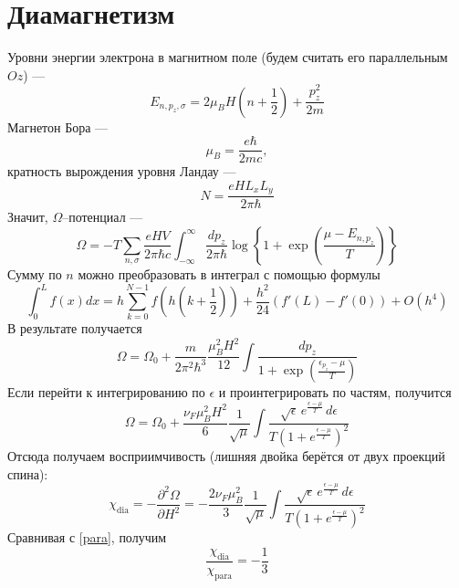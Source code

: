 \documentclass{article}
\begin{document}
\section{Диамагнетизм}
Уровни энергии электрона в магнитном поле (будем считать его параллельным $Oz$) ---
\begin{equation}
    E_{n,p_z,\sigma} = 2\mu_B H \left(n + \frac{1}{2}\right) + 
                       \frac{p_z^2}{2m}
\end{equation}
Магнетон Бора ---
\begin{equation}
    \mu_B = \frac{e\hbar}{2mc},
\end{equation}
кратность вырождения уровня Ландау ---
\begin{equation}
    N = \frac{eHL_xL_y}{2\pi\hbar}
\end{equation}
Значит, $\Omega$--потенциал --- 
\begin{equation}
    \Omega = -T\sum_{n,\sigma} \frac{eHV}{2\pi\hbar c} 
                \int_{-\infty}^{\infty} \frac{dp_z}{2\pi\hbar}
                \log{\left\{1 + \exp{\left(\frac{\mu - E_{n,p_z}}{T}\right)}\right\}}
\end{equation}
Сумму по $n$ можно преобразовать в интеграл с помощью формулы
\begin{equation}
    \int_0^L f(x) dx = h\sum_{k=0}^{N-1} f(h(k+{\textstyle \frac12}))
                       +{\textstyle\frac{h^2}{24}} \left(f'(L) - f'(0)\right) + O(h^4)
\end{equation}
В результате получается
\begin{equation}
    \Omega = \Omega_0 + \frac{m}{2\pi^2\hbar^3} \frac{\mu_B^2 H^2}{12}
                \int\frac{dp_z}{1 + \exp{\displaystyle\left(\frac{\epsilon_{p_z} - \mu}{T}\right)}} 
\end{equation}
Если перейти к интегрированию по $\epsilon$ и проинтегрировать по частям, получится
\begin{equation}
    \Omega = \Omega_0 + \frac{\nu_F \mu_B^2 H^2}{6} \frac{1}{\sqrt{\mu}}
                \int \frac{\sqrt{\epsilon}\, e^{\frac{\epsilon-\mu}{T}} \,d\epsilon}
                          {T\left(1 + e^{\frac{\epsilon-\mu}{T}}\right)^2}
\end{equation}
Отсюда получаем восприимчивость (лишняя двойка берётся от двух проекций спина):
\begin{equation}
    \chi_{\mathrm{dia}} = -\frac{\partial^2 \Omega}{\partial H^2} = 
                -\frac{2\nu_F \mu_B^2}{3} \frac{1}{\sqrt{\mu}}
                \int \frac{\sqrt{\epsilon}\, e^{\frac{\epsilon-\mu}{T}} \,d\epsilon}
                          {T\left(1 + e^{\frac{\epsilon-\mu}{T}}\right)^2}
\end{equation}
Сравнивая с \eqref{para}, получим
\begin{equation}
    \frac{\chi_\mathrm{dia}}{\chi_\mathrm{para}} = -\frac{1}{3}
\end{equation}
\end{document}
